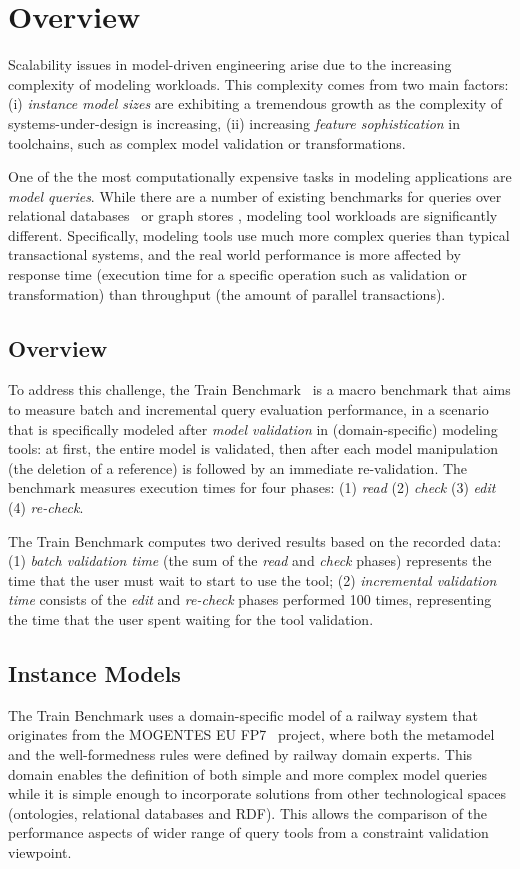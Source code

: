 \chapter{Overview}

Scalability issues in model-driven engineering arise due to the increasing
complexity of modeling workloads. This complexity comes from two main factors:
(i) \emph{instance model sizes} are exhibiting a tremendous growth as the
complexity of systems-under-design is increasing, (ii) increasing \emph{feature
sophistication} in toolchains, such as complex model validation or
transformations.

One of the the most computationally expensive tasks in modeling applications are
\emph{model queries}. While there are a number of existing benchmarks for
queries over relational databases~\cite{tpc-c} or graph stores
\cite{BSBM, SP2Bench}, modeling tool workloads are significantly
different. Specifically, modeling tools use much more complex queries than
typical transactional systems, and the real world performance is more affected by
response time (\ie execution time for a specific operation such as validation
or transformation) than throughput (\ie the amount of parallel transactions).


\section{Overview}
To address this challenge, the Train Benchmark~\cite{SCP2014,TBwebsite} is a macro
benchmark that aims to measure batch and incremental query evaluation
performance, in a scenario that is specifically modeled after \emph{model
validation} in (domain-specific) modeling tools: at first, the entire model is
validated, then after each model manipulation (\eg the deletion of a
reference) is followed by an immediate re-validation. The benchmark measures
execution times for four phases: (1) \emph{read} (2) \emph{check} (3) \emph{edit} (4) \emph{re-check}.

The Train Benchmark computes two derived results based on the recorded data:
(1) \emph{batch validation time} (the sum of the \emph{read} and \emph{check} phases)
represents the time that the user must wait to start to use the tool; (2)
\emph{incremental validation time} consists of the \emph{edit} and
\emph{re-check} phases performed 100 times, representing the time that the
user spent waiting for the tool validation.


\section{Instance Models}
The Train Benchmark uses a domain-specific model of a railway system that
originates from the \mbox{MOGENTES} EU FP7~\cite{Mogentes} project, where both the metamodel and the
well-formedness rules were defined by railway domain experts. This domain
enables the definition of both simple and more complex model queries while it is
simple enough to incorporate solutions from other technological spaces
(\eg ontologies, relational databases and RDF). This allows the comparison of
the performance aspects of wider range of query tools from a constraint
validation viewpoint.

